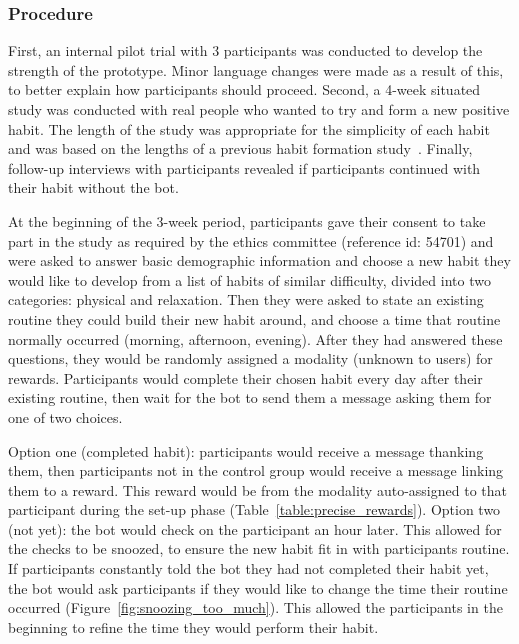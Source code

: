 \subsubsection{Procedure}
First, an internal pilot trial with 3 participants was conducted to develop the strength of the prototype. Minor language changes were made as a result of this, to better explain how participants should proceed. Second, a  4-week situated study was conducted with real people who wanted to try and form a new positive habit. The length of the study was appropriate for the simplicity of each habit and was based on the lengths of a previous habit formation study~\cite{article_beyond_self_tracking_designing_apps}. Finally, follow-up interviews with participants revealed if participants continued with their habit without the bot.

At the beginning of the 3-week period, participants gave their consent to take part in the study as required by the ethics committee (reference id: 54701) and were asked to answer basic demographic information and choose a new habit they would like to develop from a list of habits of similar difficulty, divided into two categories: physical and relaxation. Then they were asked to state an existing routine they could build their new habit around, and choose a time that routine normally occurred (morning, afternoon, evening). After they had answered these questions, they would be randomly assigned a modality (unknown to users) for rewards. Participants would complete their chosen habit every day after their existing routine, then wait for the bot to send them a message asking them for one of two choices.

Option one (completed habit): participants would receive a message thanking them, then participants not in the control group would receive a message linking them to a reward. This reward would be from the modality auto-assigned to that participant during the set-up phase (Table~\ref{table:precise_rewards}). Option two (not yet): the bot would check on the participant an hour later. This allowed for the checks to be snoozed, to ensure the new habit fit in with participants routine. If participants constantly told the bot they had not completed their habit yet, the bot would ask participants if they would like to change the time their routine occurred (Figure~\ref{fig:snoozing_too_much}). This allowed the participants in the beginning to refine the time they would perform their habit.


